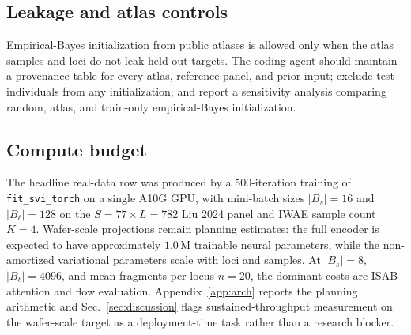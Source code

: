 \subsection{Leakage and atlas controls}
Empirical-Bayes initialization from public atlases is allowed only when the atlas samples and loci do not leak held-out targets. The coding agent should maintain a provenance table for every atlas, reference panel, and prior input; exclude test individuals from any initialization; and report a sensitivity analysis comparing random, atlas, and train-only empirical-Bayes initialization.

\subsection{Compute budget}
The headline real-data row was produced by a $500$-iteration training of \texttt{fit\_svi\_torch} on a single A10G GPU, with mini-batch sizes $|B_s|=16$ and $|B_\ell|=128$ on the $S=77 \times L=782$ Liu 2024 panel and IWAE sample count $K=4$. Wafer-scale projections remain planning estimates: the full encoder is expected to have approximately $1.0\,\text{M}$ trainable neural parameters, while the non-amortized variational parameters scale with loci and samples. At $|B_s|=8$, $|B_\ell|=4096$, and mean fragments per locus $\bar n=20$, the dominant costs are ISAB attention and flow evaluation. Appendix~\ref{app:arch} reports the planning arithmetic and Sec.~\ref{sec:discussion} flags sustained-throughput measurement on the wafer-scale target as a deployment-time task rather than a research blocker.

